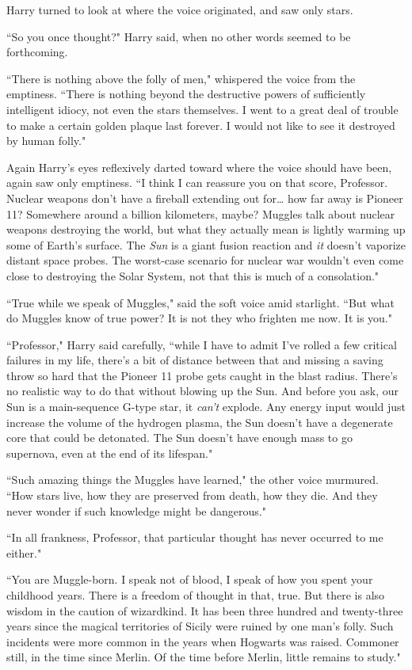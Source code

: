 Harry turned to look at where the voice originated, and saw only stars.

``So you once thought?" Harry said, when no other words seemed to be forthcoming.

``There is nothing above the folly of men," whispered the voice from the emptiness. ``There is nothing beyond the destructive powers of sufficiently intelligent idiocy, not even the stars themselves. I went to a great deal of trouble to make a certain golden plaque last forever. I would not like to see it destroyed by human folly."

Again Harry's eyes reflexively darted toward where the voice should have been, again saw only emptiness. ``I think I can reassure you on that score, Professor. Nuclear weapons don't have a fireball extending out for{\ldots} how far away is Pioneer 11? Somewhere around a billion kilometers, maybe? Muggles talk about nuclear weapons destroying the world, but what they actually mean is lightly warming up some of Earth's surface. The \emph{Sun} is a giant fusion reaction and \emph{it} doesn't vaporize distant space probes. The worst-case scenario for nuclear war wouldn't even come close to destroying the Solar System, not that this is much of a consolation."

``True while we speak of Muggles," said the soft voice amid starlight. ``But what do Muggles know of true power? It is not they who frighten me now. It is you."

``Professor," Harry said carefully, ``while I have to admit I've rolled a few critical failures in my life, there's a bit of distance between that and missing a saving throw so hard that the Pioneer 11 probe gets caught in the blast radius. There's no realistic way to do that without blowing up the Sun. And before you ask, our Sun is a main-sequence G-type star, it \emph{can't} explode. Any energy input would just increase the volume of the hydrogen plasma, the Sun doesn't have a degenerate core that could be detonated. The Sun doesn't have enough mass to go supernova, even at the end of its lifespan."

``Such amazing things the Muggles have learned," the other voice murmured. ``How stars live, how they are preserved from death, how they die. And they never wonder if such knowledge might be dangerous."

``In all frankness, Professor, that particular thought has never occurred to me either."

``You are Muggle-born. I speak not of blood, I speak of how you spent your childhood years. There is a freedom of thought in that, true. But there is also wisdom in the caution of wizardkind. It has been three hundred and twenty-three years since the magical territories of Sicily were ruined by one man's folly. Such incidents were more common in the years when Hogwarts was raised. Commoner still, in the time since Merlin. Of the time before Merlin, little remains to study."

